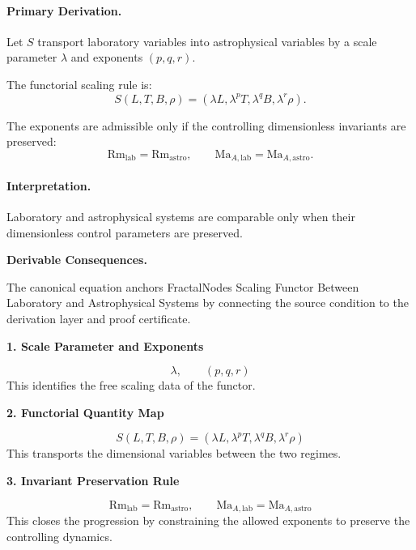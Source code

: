 \paragraph{Primary Derivation.}
Let $S$ transport laboratory variables into astrophysical variables by a scale parameter $\lambda$ and exponents $(p,q,r)$.

The functorial scaling rule is:
\begin{equation}
S(L,T,B,\rho)
=
(\lambda L,\lambda^{p}T,\lambda^{q}B,\lambda^{r}\rho).
\end{equation}

The exponents are admissible only if the controlling dimensionless invariants are preserved:
\begin{equation}
\boxed{
\mathrm{Rm}_{\mathrm{lab}}=\mathrm{Rm}_{\mathrm{astro}},
\qquad
\mathrm{Ma}_{A,\mathrm{lab}}=\mathrm{Ma}_{A,\mathrm{astro}}.
}
\end{equation}

\paragraph{Interpretation.}
Laboratory and astrophysical systems are comparable only when their dimensionless control parameters are preserved.

\par\vspace{0.35em}
\noindent\textbf{Derivable Consequences.}\quad
\begingroup
\footnotesize
\raggedright
The canonical equation anchors FractalNodes Scaling Functor Between Laboratory and Astrophysical Systems by connecting the source condition to the derivation layer and proof certificate.
\par\endgroup

\noindent\textbf{1. Scale Parameter and Exponents}\par
\[
\lambda,\qquad (p,q,r)
\]
\noindent This identifies the free scaling data of the functor.\par
\noindent\textbf{2. Functorial Quantity Map}\par
\[
S(L,T,B,\rho) = (\lambda L, \lambda^{p}T, \lambda^{q}B, \lambda^{r}\rho)
\]
\noindent This transports the dimensional variables between the two regimes.\par
\noindent\textbf{3. Invariant Preservation Rule}\par
\[
\mathrm{Rm}_{\mathrm{lab}} = \mathrm{Rm}_{\mathrm{astro}},
\qquad
\mathrm{Ma}_{A,\mathrm{lab}} = \mathrm{Ma}_{A,\mathrm{astro}}
\]
\noindent This closes the progression by constraining the allowed exponents to preserve the controlling dynamics.\par

